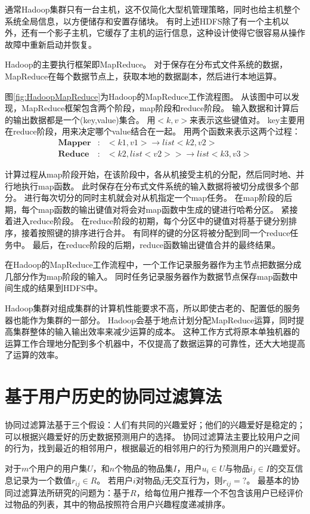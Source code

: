 通常Hadoop集群只有一台主机，这不仅简化大型机管理策略，同时也给主机整个系统全局信息，以方便储存和安置存储块。
有时上述HDFS除了有一个主机以外，还有一个影子主机，它缓存了主机的运行信息，这种设计使得它很容易从操作故障中重新启动并恢复。

Hadoop的主要执行框架即MapReduce。
对于保存在分布式文件系统的数据，MapReduce在每个数据节点上，获取本地的数据副本，然后进行本地运算。

图\ref{fig:HadoopMapReduce}为Hadoop的MapReduce工作流程图。
从该图中可以发现，MapReduce框架包含两个阶段，map阶段和reduce阶段。
输入数据和计算后的输出数据都是一个(key,value)集合。
用$<k,v>$来表示这些键值对。
key主要用在reduce阶段，用来决定哪个value结合在一起。
用两个函数来表示这两个过程：
\begin{eqnarray}
\mathbf{Mapper} &:& <k1,v1> \rightarrow list<k2,v2> \\
\mathbf{Reduce} &:& <k2,list<v2>> \rightarrow list<k3,v3>
\end{eqnarray}

计算过程从map阶段开始，在该阶段中，各从机接受主机的分配，然后同时地、并行地执行map函数。
此时保存在分布式文件系统的输入数据将被切分成很多个部分。
进行每次切分的同时主机就会对从机指定一个map任务。
在map阶段的后期，每个map函数的输出键值对将会对map函数中生成的键进行哈希分区。
紧接着进入reduce阶段。
在reduce阶段的初期，每个分区中的键值对将基于键分别排序，接着按照键的排序进行合并。
有同样的键的分区将被分配到同一个reduce任务中。
最后，在reduce阶段的后期，reduce函数输出键值合并的最终结果。

在Hadoop的MapReduce工作流程中，一个工作记录服务器作为主节点把数据分成几部分作为map阶段的输入。
同时任务记录服务器作为数据节点保存map函数中间生成的结果到HDFS中。

Hadoop集群对组成集群的计算机性能要求不高，所以即使古老的、配置低的服务器也能作为集群的一部分。
Hadoop会基于地点计划分配MapReduce运算，同时提高集群整体的输入输出效率来减少运算的成本。
这种工作方式将原本单独机器的运算工作合理地分配到多个机器中，不仅提高了数据运算的可靠性，还大大地提高了运算的效率。


\section{基于用户历史的协同过滤算法}
协同过滤算法基于三个假设：人们有共同的兴趣爱好；他们的兴趣爱好是稳定的；可以根据兴趣爱好的历史数据预测用户的选择。
协同过滤算法主要比较用户之间的行为，找到最近的相邻用户，根据最近的相邻用户的行为预测用户的兴趣爱好。

对于$m$个用户的用户集$U$，和$n$个物品的物品集$I$，用户$u_i \in U$与物品$i_j \in I$的交互信息记录为一个数值$r_{ij} \in R$。
若用户$i$对物品$j$无交互行为，则$r_{ij}=?$。
最基本的协同过滤算法所研究的问题为：基于$R$，给每位用户推荐一个不包含该用户已经评价过物品的列表，其中的物品按照符合用户兴趣程度递减排序。

